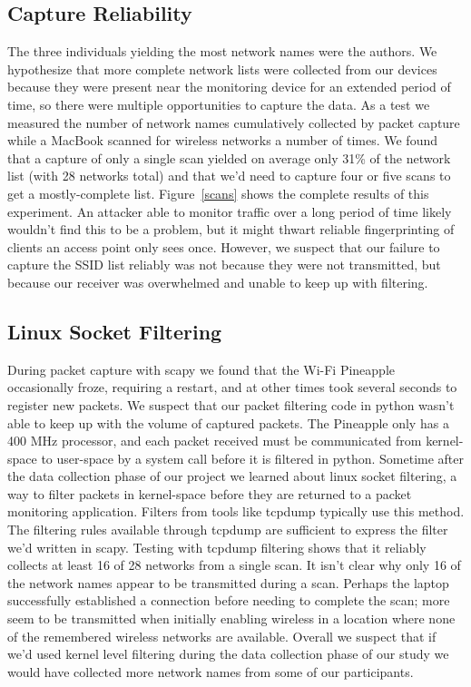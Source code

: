\documentclass[letterpaper,twocolumn,10pt]{article}
\begin{document}
\subsection{Capture Reliability}
The three individuals yielding the most network names were the authors. We hypothesize that more complete network lists were collected from our devices because they were present near the monitoring device for an extended period of time, so there were multiple opportunities to capture the data. As a test we measured the number of network names cumulatively collected by packet capture while a MacBook scanned for wireless networks a number of times. We found that a capture of only a single scan yielded on average only 31\% of the network list (with 28 networks total) and that we'd need to capture four or five scans to get a mostly-complete list. Figure~\ref{scans} shows the complete results of this experiment. An attacker able to monitor traffic over a long period of time likely wouldn't find this to be a problem, but it might thwart reliable fingerprinting of clients an access point only sees once. However, we suspect that our failure to capture the SSID list reliably was not because they were not transmitted, but because our receiver was overwhelmed and unable to keep up with filtering.

\subsection{Linux Socket Filtering}
\label{bpf}
During packet capture with scapy we found that the Wi-Fi Pineapple occasionally froze, requiring a restart, and at other times took several seconds to register new packets. We suspect that our packet filtering code in python wasn't able to keep up with the volume of captured packets. The Pineapple only has a 400 MHz processor, and each packet received must be communicated from kernel-space to user-space by a system call before it is filtered in python. Sometime after the data collection phase of our project we learned about linux socket filtering, a way to filter packets in kernel-space before they are returned to a packet monitoring application. Filters from tools like tcpdump typically use this method. The filtering rules available through tcpdump are sufficient to express the filter we'd written in scapy. Testing with tcpdump filtering shows that it reliably collects at least 16 of 28 networks from a single scan. It isn't clear why only 16 of the network names appear to be transmitted during a scan. Perhaps the laptop successfully established a connection before needing to complete the scan; more seem to be transmitted when initially enabling wireless in a location where none of the remembered wireless networks are available. Overall we suspect that if we'd used kernel level filtering during the data collection phase of our study we would have collected more network names from some of our participants.
\end{document}
